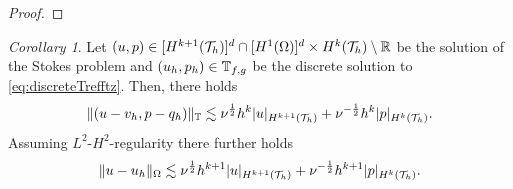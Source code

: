 \documentclass[sn-mathphys,Numbered]{sn-jnl}%
\theoremstyle{remark}%
\newtheorem{cor}[theorem]{Corollary}
\theoremstyle{definition}%
\begin{document}
\begin{proof}
\end{proof}

  

\begin{cor}
  Let $(u,p) \in [H^{k+1}({\mathcal{T}_h})]^d\cap [H^1(\Omega)]^d \times H^{k}({\mathcal{T}_h}) \setminus \mathbb{R}$ be the solution of the Stokes problem and $(u_h,p_h) \in \mathbb{T}_{f,g}$ be the discrete solution to \eqref{eq:discreteTrefftz}. 
  Then, there holds
  \begin{equation} \label{eq:aprioribound1}
    \Vert (u-v_h,p-q_h) \Vert_{\mathbb{T}} \lesssim \nu^{\frac12} h^{k} \vert u \vert_{H^{k+1}({\mathcal{T}_h})} + \nu^{-\frac12} h^{k} \vert p \vert_{H^{k}({\mathcal{T}_h})}.
  \end{equation}
  Assuming $L^2$-$H^2$-regularity there further holds
  \begin{equation}
    \Vert u-u_h \Vert_{\Omega} \lesssim \nu^{\frac12} h^{k+1} \vert u \vert_{H^{k+1}({\mathcal{T}_h})} + \nu^{-\frac12} h^{k+1} \vert p \vert_{H^{k}({\mathcal{T}_h})}.
  \end{equation}
\end{cor}    
\end{document}
